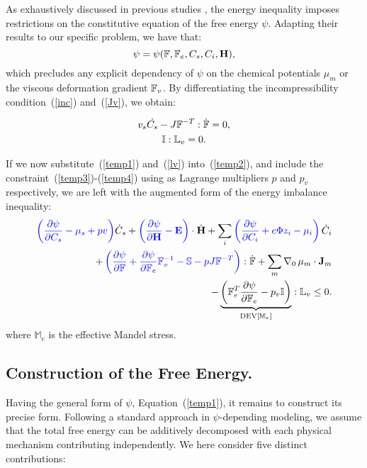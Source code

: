 As exhaustively discussed in previous studies \cite{Plasto,GURTIN}, the energy inequality imposes restrictions on the constitutive equation of the free energy $\psi$. Adapting their results to our specific problem, we have that:
\begin{equation}
\psi = \psi (\mathbb{F},\mathbb{F}_e, C_s, C_i, \mathbf{H}), \label{temp1}
\end{equation}
which precludes any explicit dependency of $\psi$ on the chemical potentials $\mu_m$ or the viscous deformation gradient $\mathbb{F}_v$. By differentiating the incompressibility condition~(\ref{inc}) and~(\ref{Jv}), we obtain:

\begin{gather}
v_s\dot{C_s} - J \mathbb{F}^{-T}:\dot{\mathbb{F}} =0, \label{temp3}\\
\mathbb{I}:\mathbb{L}_v=0. \label{temp4}
\end{gather}

If we now substitute~(\ref{temp1}) and~(\ref{lv}) into~(\ref{temp2}), and include the constraint~(\ref{temp3})-(\ref{temp4}) using as Lagrange multipliers $p$ and $p_v$ respectively, we are left with the augmented form of the energy imbalance inequality:
\begin{equation}
\begin{aligned}
 \color{blue}{\left(\frac{\partial \psi}{\partial C_s}-\mu_s+p v\right)}\color{black}\dot{C}_s+\color{blue}\left(\frac{\partial \psi}{\partial \mathbf{H}}-\mathbf{E}\right) \cdot \color{black}\dot{\mathbf{H}}+ \sum_i\color{blue}\left(\frac{\partial \psi}{\partial C_i} + e\Phi z_i-\mu_i\right) \color{black}\dot{C}_i \\
+ \color{blue} \left(\frac{\partial \psi}{\partial \mathbb{F}} + \frac{\partial \psi}{\partial\mathbb{F}_e}\mathbb{F}_v^{-1}- \mathbb{S} - p J \mathbb{F}^{-T}\right): \color{black}\dot{\mathbb{F}}+ \sum_m \nabla_0 \,\mu_m \cdot \mathbf{J}_m \\
- \underbrace{\left(\mathbb{F}_e^T\frac{\partial \psi}{\partial \mathbb{F}_e}-p_v\mathbb{I}\right)}_{\text{DEV}[\mathbb{M}_e]}:\mathbb{L}_v\leq 0 . \label{ineq}
\end{aligned}
\end{equation}
where $\mathbb{M}_e$ is the effective Mandel stress. 
\subsection{Construction of the Free Energy.}
\label{freeenergy}
Having the general form of $\psi$, Equation~(\ref{temp1}), it remains to construct its precise form. Following a standard approach in $\psi$-depending modeling, we assume that the total free energy can be additively decomposed with each physical mechanism contributing independently. We here consider five distinct contributions:

